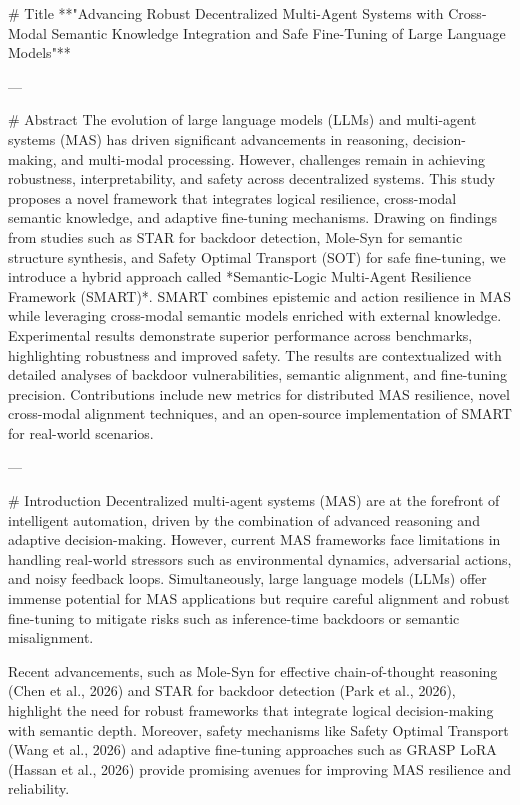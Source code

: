 # Title  
**"Advancing Robust Decentralized Multi-Agent Systems with Cross-Modal Semantic Knowledge Integration and Safe Fine-Tuning of Large Language Models"**

---

# Abstract  
The evolution of large language models (LLMs) and multi-agent systems (MAS) has driven significant advancements in reasoning, decision-making, and multi-modal processing. However, challenges remain in achieving robustness, interpretability, and safety across decentralized systems. This study proposes a novel framework that integrates logical resilience, cross-modal semantic knowledge, and adaptive fine-tuning mechanisms. Drawing on findings from studies such as STAR for backdoor detection, Mole-Syn for semantic structure synthesis, and Safety Optimal Transport (SOT) for safe fine-tuning, we introduce a hybrid approach called *Semantic-Logic Multi-Agent Resilience Framework (SMART)*. SMART combines epistemic and action resilience in MAS while leveraging cross-modal semantic models enriched with external knowledge. Experimental results demonstrate superior performance across benchmarks, highlighting robustness and improved safety. The results are contextualized with detailed analyses of backdoor vulnerabilities, semantic alignment, and fine-tuning precision. Contributions include new metrics for distributed MAS resilience, novel cross-modal alignment techniques, and an open-source implementation of SMART for real-world scenarios.

---

# Introduction  
Decentralized multi-agent systems (MAS) are at the forefront of intelligent automation, driven by the combination of advanced reasoning and adaptive decision-making. However, current MAS frameworks face limitations in handling real-world stressors such as environmental dynamics, adversarial actions, and noisy feedback loops. Simultaneously, large language models (LLMs) offer immense potential for MAS applications but require careful alignment and robust fine-tuning to mitigate risks such as inference-time backdoors or semantic misalignment.

Recent advancements, such as Mole-Syn for effective chain-of-thought reasoning (Chen et al., 2026) and STAR for backdoor detection (Park et al., 2026), highlight the need for robust frameworks that integrate logical decision-making with semantic depth. Moreover, safety mechanisms like Safety Optimal Transport (Wang et al., 2026) and adaptive fine-tuning approaches such as GRASP LoRA (Hassan et al., 2026) provide promising avenues for improving MAS resilience and reliability.

